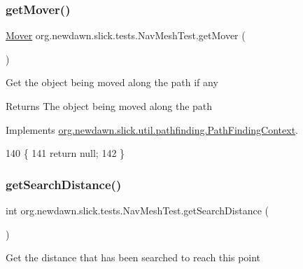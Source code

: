 \subsubsection{\texorpdfstring{get\+Mover()}{getMover()}}
{\footnotesize\ttfamily \mbox{\hyperlink{interfaceorg_1_1newdawn_1_1slick_1_1util_1_1pathfinding_1_1_mover}{Mover}} org.\+newdawn.\+slick.\+tests.\+Nav\+Mesh\+Test.\+get\+Mover (\begin{DoxyParamCaption}{ }\end{DoxyParamCaption})\hspace{0.3cm}{\ttfamily [inline]}}

Get the object being moved along the path if any

\begin{DoxyReturn}{Returns}
The object being moved along the path 
\end{DoxyReturn}


Implements \mbox{\hyperlink{interfaceorg_1_1newdawn_1_1slick_1_1util_1_1pathfinding_1_1_path_finding_context_a50e439d467ccdf457dca18ca60ab367c}{org.\+newdawn.\+slick.\+util.\+pathfinding.\+Path\+Finding\+Context}}.


\begin{DoxyCode}
140                             \{
141         \textcolor{keywordflow}{return} null;
142     \}
\end{DoxyCode}
\mbox{\label{classorg_1_1newdawn_1_1slick_1_1tests_1_1_nav_mesh_test_ada8b9e7b14d4ca0de9094cd67f0ec9bf}} 
\subsubsection{\texorpdfstring{get\+Search\+Distance()}{getSearchDistance()}}
{\footnotesize\ttfamily int org.\+newdawn.\+slick.\+tests.\+Nav\+Mesh\+Test.\+get\+Search\+Distance (\begin{DoxyParamCaption}{ }\end{DoxyParamCaption})\hspace{0.3cm}{\ttfamily [inline]}}

Get the distance that has been searched to reach this point

